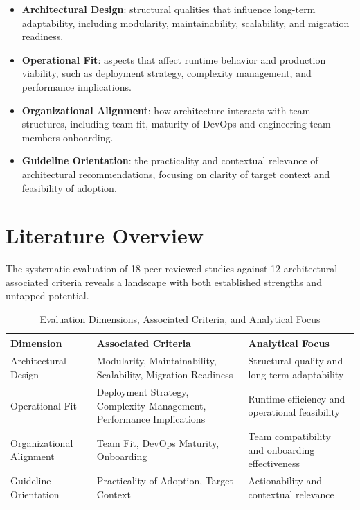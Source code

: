 \begin{itemize}[itemsep=8pt,topsep=2pt]
    \item \textbf{Architectural Design}: structural qualities that influence long-term adaptability, including modularity, maintainability, scalability, and migration readiness.
    \item \textbf{Operational Fit}: aspects that affect runtime behavior and production viability, such as deployment strategy, complexity management, and performance implications.
    \item \textbf{Organizational Alignment}: how architecture interacts with team structures, including team fit, maturity of DevOps and engineering team members onboarding.
    \item \textbf{Guideline Orientation}: the practicality and contextual relevance of architectural recommendations, focusing on clarity of target context and feasibility of adoption.
\end{itemize}

\section{Literature Overview}

The systematic evaluation of 18 peer-reviewed studies against 12 architectural associated criteria reveals a landscape with both established strengths and untapped potential.

\begin{table}[H]
\centering
\small
\caption{Evaluation Dimensions, Associated Criteria, and Analytical Focus}
\label{tab:criteria-dimensions-summary}
\begin{tabular}{|p{3.8cm}|p{7.2cm}|p{4.2cm}|}
\hline
\rowcolor{gray!30}
\textbf{Dimension} & \textbf{Associated Criteria} & \textbf{Analytical Focus} \\
\hline
Architectural Design & Modularity, Maintainability, Scalability, Migration Readiness & Structural quality and long-term adaptability \\
Operational Fit & Deployment Strategy, Complexity Management, Performance Implications & Runtime efficiency and operational feasibility \\
Organizational Alignment & Team Fit, DevOps Maturity, Onboarding & Team compatibility and onboarding effectiveness \\
Guideline Orientation & Practicality of Adoption, Target Context & Actionability and contextual relevance \\
\hline
\end{tabular}
\end{table}
\vspace{1em}

